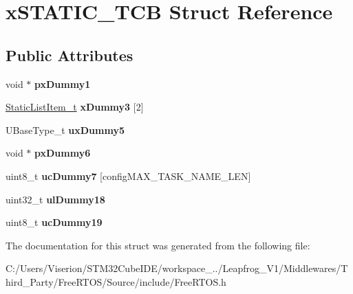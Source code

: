 \hypertarget{structx_s_t_a_t_i_c___t_c_b}{}\section{x\+S\+T\+A\+T\+I\+C\+\_\+\+T\+CB Struct Reference}
\label{structx_s_t_a_t_i_c___t_c_b}
\subsection*{Public Attributes}
\begin{DoxyCompactItemize}
\item 
\mbox{\label{structx_s_t_a_t_i_c___t_c_b_a2f66b620fdeb13f8969f27e1bbb4d1d1}} 
void $\ast$ {\bfseries px\+Dummy1}
\item 
\mbox{\label{structx_s_t_a_t_i_c___t_c_b_a7f182aa8f5003494f63d975dabcb3ec1}} 
\mbox{\hyperlink{structx_s_t_a_t_i_c___l_i_s_t___i_t_e_m}{Static\+List\+Item\+\_\+t}} {\bfseries x\+Dummy3} \mbox{[}2\mbox{]}
\item 
\mbox{\label{structx_s_t_a_t_i_c___t_c_b_ab950bb498901ef7291e49086e5a2efd0}} 
U\+Base\+Type\+\_\+t {\bfseries ux\+Dummy5}
\item 
\mbox{\label{structx_s_t_a_t_i_c___t_c_b_a416495e152e5caef64994f72329c60b0}} 
void $\ast$ {\bfseries px\+Dummy6}
\item 
\mbox{\label{structx_s_t_a_t_i_c___t_c_b_a308771ccd6723cad777695d84a0a2a30}} 
uint8\+\_\+t {\bfseries uc\+Dummy7} \mbox{[}config\+M\+A\+X\+\_\+\+T\+A\+S\+K\+\_\+\+N\+A\+M\+E\+\_\+\+L\+EN\mbox{]}
\item 
\mbox{\label{structx_s_t_a_t_i_c___t_c_b_ade6781276f913dcd592ee0f6cce76c7e}} 
uint32\+\_\+t {\bfseries ul\+Dummy18}
\item 
\mbox{\label{structx_s_t_a_t_i_c___t_c_b_aa98151056a161f180013ae36dae0d17b}} 
uint8\+\_\+t {\bfseries uc\+Dummy19}
\end{DoxyCompactItemize}


The documentation for this struct was generated from the following file\+:\begin{DoxyCompactItemize}
\item 
C\+:/\+Users/\+Viserion/\+S\+T\+M32\+Cube\+I\+D\+E/workspace\+\_../\+Leapfrog\+\_\+\+V1/\+Middlewares/\+Third\+\_\+\+Party/\+Free\+R\+T\+O\+S/\+Source/include/Free\+R\+T\+O\+S.\+h\end{DoxyCompactItemize}
